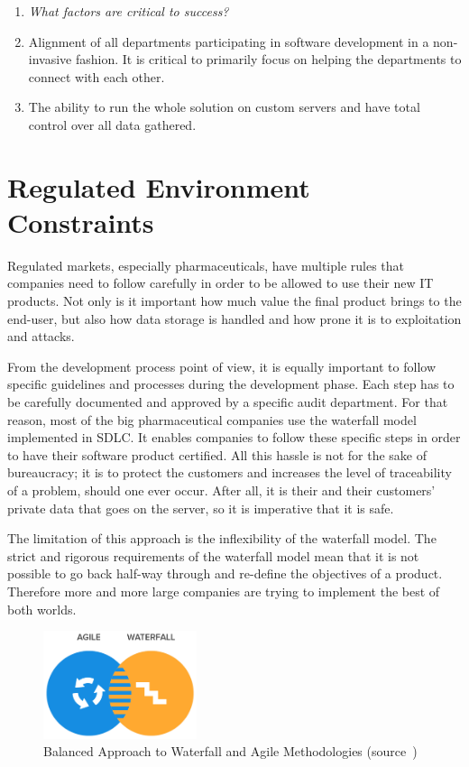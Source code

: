 \begin{enumerate}
	\item \emph{What factors are critical to success?	}
	\item[] Alignment of all departments participating in software development in a non-invasive fashion. It is critical to primarily focus on helping the departments to connect with each other.
	\item[] The ability to run the whole solution on custom servers and have total control over all data gathered.
	
\end{enumerate}


\section{Regulated Environment Constraints}

Regulated markets, especially pharmaceuticals, have multiple rules that companies need to follow carefully in order to be allowed to use their new IT products. Not only is it important how much value the final product brings to the end-user, but also how data storage is handled and how prone it is to exploitation and attacks. 

From the development process point of view, it is equally important to follow specific guidelines and processes during the development phase. Each step has to be carefully documented and approved by a specific audit department. For that reason, most of the big pharmaceutical companies use the waterfall model implemented in SDLC. It enables companies to follow these specific steps in order to have their software product certified. All this hassle is not for the sake of bureaucracy; it is to protect the customers and increases the level of traceability of a problem, should one ever occur. After all, it is their and their customers' private data that goes on the server, so it is imperative that it is safe.

The limitation of this approach is the inflexibility of the waterfall model. The strict and rigorous requirements of the waterfall model mean that it is not possible to go back half-way through and re-define the objectives of a product. Therefore more and more large companies are trying to implement the best of both worlds.

\begin{figure}[!ht]
	\centering
	\includegraphics[width=0.4\textwidth]{figures/02_analysis/agile-waterfall}
    \caption[Balanced Approach to Waterfall and Agile Methodologies]{Balanced Approach to Waterfall and Agile Methodologies (source~\protect\cite{agile-waterfall})}
\end{figure}

